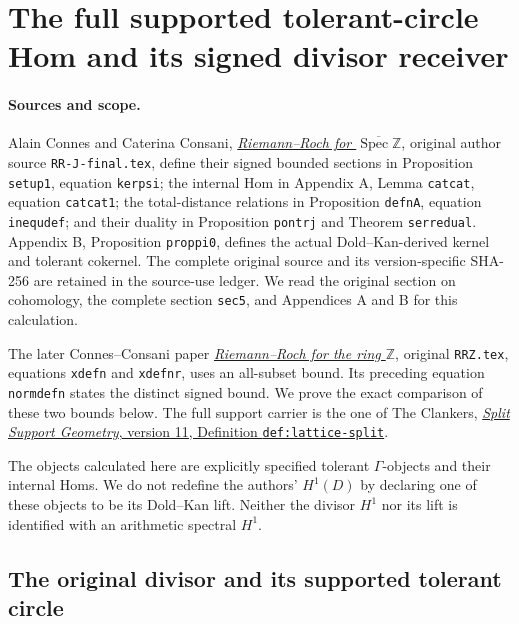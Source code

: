 \section{The full supported tolerant-circle Hom and its signed divisor receiver}
\label{sec:supported-tolerance-duality}

\paragraph{Sources and scope.}
Alain Connes and Caterina Consani,
\href{https://arxiv.org/abs/2205.01391v2}{\emph{Riemann--Roch for
$\overline{\operatorname{Spec}\mathbb Z}$}}, original author source
\nolinkurl{RR-J-final.tex}, define their signed bounded sections in
Proposition \texttt{setup1}, equation \texttt{kerpsi}; the internal Hom
in Appendix A, Lemma \texttt{catcat}, equation \texttt{catcat1};
the total-distance relations in Proposition \texttt{defnA}, equation
\texttt{inequdef}; and their duality in Proposition \texttt{pontrj}
and Theorem \texttt{serredual}. Appendix B, Proposition
\texttt{proppi0}, defines the actual Dold--Kan-derived kernel and
tolerant cokernel. The complete original source and its version-specific
SHA-256 are retained in the source-use ledger.
We read the original section on cohomology, the complete section
\texttt{sec5}, and Appendices A and B for this calculation.

The later Connes--Consani paper
\href{https://arxiv.org/abs/2306.00456v1}{\emph{Riemann--Roch for the
ring $\mathbb Z$}}, original \nolinkurl{RRZ.tex}, equations
\texttt{xdefn} and \texttt{xdefnr}, uses an all-subset bound.
Its preceding equation \texttt{normdefn} states the distinct signed
bound. We prove the exact comparison of these two bounds below.
The full support carrier is the one of The Clankers,
\href{https://github.com/KokunoYumeto/zeta-function-research-reader/blob/a2851f9eb352e7e4376bc629de86fa4ed9c1c434/workbenches/splitzero-tandem/foundations/split-support-geometry-v11/split_support_geometry_arithmetic_curve_v11.tex#L1226}
{\emph{Split Support Geometry}, version 11,
Definition \texttt{def:lattice-split}}.

The objects calculated here are explicitly specified tolerant
$\Gamma$-objects and their internal Homs. We do not redefine the
authors' $H^1(D)$ by declaring one of these objects to be its
Dold--Kan lift. Neither the divisor $H^1$ nor its lift is identified
with an arithmetic spectral $H^1$.

\subsection{The original divisor and its supported tolerant circle}

